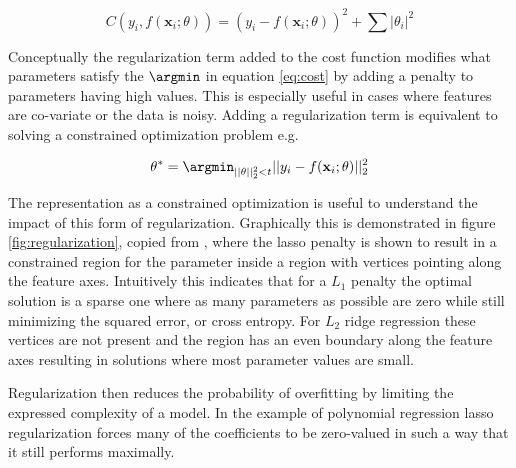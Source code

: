 \begin{equation}\label{eq:mse_ridge}
C(y_i, f(\mathbf{x}_i; \theta)) = (y_i - f(\mathbf{x}_i; \theta))^2 + \sum|\theta_i|^2
\end{equation}

\noindent Conceptually the regularization term added to the cost function modifies what parameters satisfy the $\argmin$ in equation \ref{eq:cost} by adding a penalty to parameters having high values. This is especially useful in cases where features are co-variate or the data is noisy. Adding a regularization term is equivalent to solving a constrained optimization problem e.g. 

\begin{align}
\theta^* = \argmin_{||\theta||_2^2<t} ||y_i - f(\mathbf{x}_i; \theta)||_2^2
\end{align}

\noindent The representation as a constrained optimization is useful to understand the impact of this form of regularization. Graphically this is demonstrated in figure \ref{fig:regularization}, copied from \cite{Mehta2019}, where the lasso penalty is shown to result in a constrained region for the parameter inside a region with vertices pointing along the feature axes. Intuitively this indicates that for a $L_1$ penalty the optimal solution is a sparse one where as many parameters as possible are zero while still minimizing the squared error, or cross entropy. For $L_2$ ridge regression these vertices are not present and the region has an even boundary along the feature axes resulting in solutions where most parameter values are small. 

Regularization then reduces the probability of overfitting by limiting the expressed complexity of a model. In the example of polynomial regression lasso regularization forces many of the coefficients to be zero-valued in such a way that it still performs maximally.  

